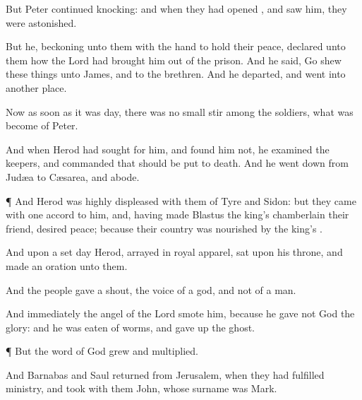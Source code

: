 {But
Peter
continued
knocking:
and when they had
opened
{}, and
saw
him, they were
astonished.

But he,
beckoning unto
them with the
hand to hold their
peace,
declared unto
them
how the
Lord had
brought
him out
of the
prison.
And he
said, Go
shew these
things unto
James,
and to the
brethren.
And he
departed, and
went
into
another
place.

Now as soon as it
was
day, there
was
no
small
stir
among the
soldiers,
what was
become of
Peter.

And when
Herod had
sought for
him,
and found
him
not, he
examined the
keepers, and commanded
that
{} should be put to
death.
And he went
down
from
Judæa
to
Cæsarea,
and
{}
abode.


\par }{\PP {}¶
And
Herod
was highly
displeased with them of
Tyre
and
Sidon:
but they
came with one
accord
to
him,
and, having
made
Blastus the
king’s
chamberlain their
friend,
desired
peace;
because
their
country was
nourished
by the
king’s
{}.

And upon a
set
day
Herod, arrayed
in
royal
apparel,
sat
upon his
throne, and made an
oration
unto
them.

And the
people gave a
shout,
{} the
voice of a
god,
and
not of a
man.

And
immediately the
angel of the
Lord
smote
him,
because he
gave
not
God the
glory:
and he
was eaten of
worms, and gave up the
ghost.


\par }{\PP {}¶
But the
word of
God
grew
and
multiplied.

And
Barnabas
and
Saul
returned
from
Jerusalem, when they had
fulfilled
{}
ministry,
and took with
them
John, whose surname
was
Mark.




\par }
